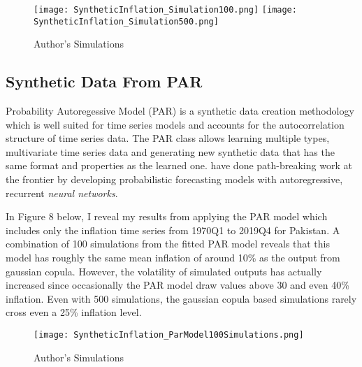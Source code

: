 \documentclass[12pt]{article}
\newcommand{\1}{\mathbbm 1}
\begin{document}
		
		
		
		
		
		
		\begin{figure}[H]
			\begin{Center}
				\texttt{[image: SyntheticInflation\_Simulation100.png]}
				\texttt{[image: SyntheticInflation\_Simulation500.png]}
				\caption{Author's Simulations}
			\end{Center}
		\end{figure}
		
		\subsection{Synthetic Data From PAR}
		
		Probability Autoregessive Model (PAR) is a synthetic data creation methodology which is well suited for time series models and accounts for the autocorrelation structure of time series data. The PAR class allows learning multiple types, multivariate time series data and generating new synthetic data that has the same format and properties as the learned one. \cite{salinas2020deepar} have done path-breaking work at the frontier by developing probabilistic forecasting models with autoregressive, recurrent \textit{neural networks}.
		
		In Figure 8 below, I reveal my results from applying the PAR model which includes only the inflation time series from 1970Q1 to 2019Q4 for Pakistan. A combination of 100 simulations from the fitted PAR model reveals that this model has roughly the same mean inflation of around 10\% as the output from gaussian copula. However, the volatility of simulated outputs has actually increased since occasionally the PAR model draw values above 30 and even 40\% inflation. Even with 500 simulations, the gaussian copula based simulations rarely cross even a 25\% inflation level.
		
		
		
		\begin{figure}[H]
			\begin{Center}
				\texttt{[image: SyntheticInflation\_ParModel100Simulations.png]}
				\caption{Author's Simulations}
			\end{Center}
		\end{figure}
		
		
		
\end{document}
